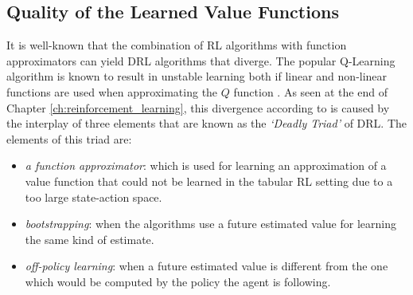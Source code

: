 

\subsection{Quality of the Learned Value Functions}
\label{sec:quality_of_value_functions}

It is well-known that the combination of RL algorithms with function approximators can yield DRL algorithms that diverge. The popular Q-Learning algorithm is known to result in unstable learning both if linear \cite{tsitsiklis1997analysis} and non-linear functions are used when approximating the $Q$ function \cite{van2018deep_triad}. As seen at the end of Chapter \ref{ch:reinforcement_learning}, this divergence according to \citet{sutton2018reinforcement} is caused by the interplay of three elements that are known as the \textit{`Deadly Triad'} of DRL. The elements of this triad are:
\begin{itemize}
    \item \textit{a function approximator}: which is used for learning an approximation of a value function that could not be learned in the tabular RL setting due to a too large state-action space.
    \item \textit{bootstrapping}: when the algorithms use a future estimated value for learning the same kind of estimate.
    \item \textit{off-policy learning}: when a future estimated value is different from the one which would be computed by the policy the agent is following.
\end{itemize}{}

